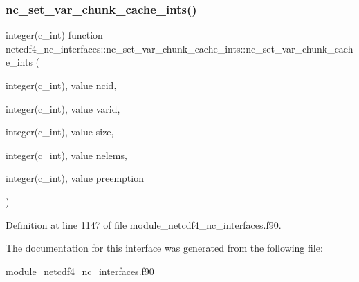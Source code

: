 \subsubsection{\texorpdfstring{nc\+\_\+set\+\_\+var\+\_\+chunk\+\_\+cache\+\_\+ints()}{nc\_set\_var\_chunk\_cache\_ints()}}
{\footnotesize\ttfamily integer(c\+\_\+int) function netcdf4\+\_\+nc\+\_\+interfaces\+::nc\+\_\+set\+\_\+var\+\_\+chunk\+\_\+cache\+\_\+ints\+::nc\+\_\+set\+\_\+var\+\_\+chunk\+\_\+cache\+\_\+ints (\begin{DoxyParamCaption}\item[{integer(c\+\_\+int), value}]{ncid,  }\item[{integer(c\+\_\+int), value}]{varid,  }\item[{integer(c\+\_\+int), value}]{size,  }\item[{integer(c\+\_\+int), value}]{nelems,  }\item[{integer(c\+\_\+int), value}]{preemption }\end{DoxyParamCaption})}



Definition at line 1147 of file module\+\_\+netcdf4\+\_\+nc\+\_\+interfaces.\+f90.



The documentation for this interface was generated from the following file\+:\begin{DoxyCompactItemize}
\item 
\hyperlink{module__netcdf4__nc__interfaces_8f90}{module\+\_\+netcdf4\+\_\+nc\+\_\+interfaces.\+f90}\end{DoxyCompactItemize}
